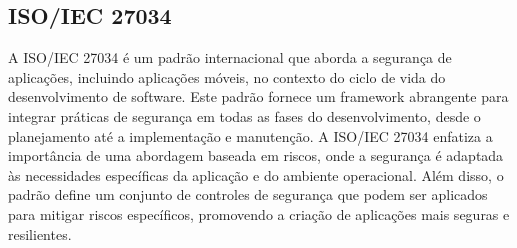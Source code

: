     \subsection{ISO/IEC 27034} 
    A ISO/IEC 27034 \cite{iso2018} é um padrão internacional que aborda a segurança de aplicações, incluindo aplicações móveis, no contexto do ciclo de vida do desenvolvimento de software. Este padrão fornece um framework abrangente para integrar práticas de segurança em todas as fases do desenvolvimento, desde o planejamento até a implementação e manutenção. A ISO/IEC 27034 enfatiza a importância de uma abordagem baseada em riscos, onde a segurança é adaptada às necessidades específicas da aplicação e do ambiente operacional. Além disso, o padrão define um conjunto de controles de segurança que podem ser aplicados para mitigar riscos específicos, promovendo a criação de aplicações mais seguras e resilientes.